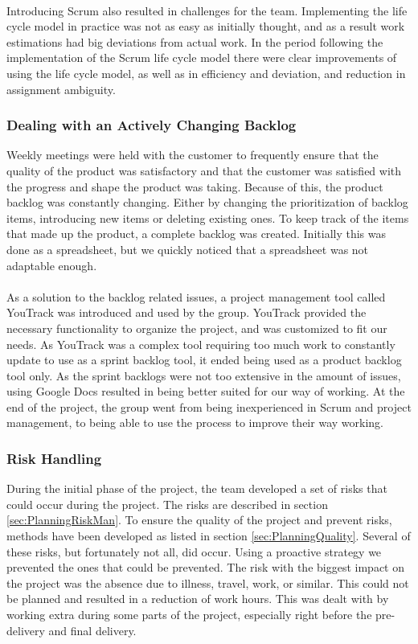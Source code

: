 \paragraph{} Introducing Scrum also resulted in challenges for the team. Implementing the life cycle model in practice was not as easy as initially thought, and as a result work estimations had big deviations from actual work. In the period following the implementation of the Scrum life cycle model there were clear improvements of using the life cycle model, as well as in efficiency and deviation, and reduction in assignment ambiguity.
\subsubsection{Dealing with an Actively Changing Backlog} Weekly meetings were held with the customer to frequently ensure that the quality of the product was satisfactory and that the customer was satisfied with the progress and shape the product was taking. Because of this, the product backlog was constantly changing. Either by changing the prioritization of backlog items, introducing new items or deleting existing ones. To keep track of the items that made up the product, a complete backlog was created. Initially this was done as a spreadsheet, but we quickly noticed that a spreadsheet was not adaptable enough.
\paragraph{} As a solution to the backlog related issues, a project management tool called YouTrack was introduced and used by the group. YouTrack provided the necessary functionality to organize the project, and was customized to fit our needs. As YouTrack was a complex tool requiring too much work to constantly update to use as a sprint backlog tool, it ended being used as a product backlog tool only. As the sprint backlogs were not too extensive in the amount of issues, using Google Docs resulted in being better suited for our way of working. At the end of the project, the group went from being inexperienced in Scrum and project management, to being able to use the process to improve their way working.
\subsubsection{Risk Handling} During the initial phase of the project, the team developed a set of risks that could occur during the project. The risks are described in section \ref{sec:PlanningRiskMan}. To ensure the quality of the project and prevent risks, methods have been developed as listed in section \ref{sec:PlanningQuality}. Several of these risks, but fortunately not all, did occur. Using a proactive strategy we prevented the ones that could be prevented. The risk with the biggest impact on the project was the absence due to illness, travel, work, or similar. This could not be planned and resulted in a reduction of work hours. This was dealt with by working extra during some parts of the project, especially right before the pre-delivery and final delivery. 
